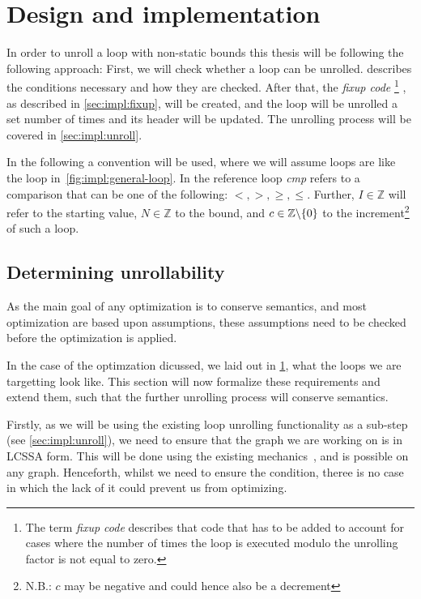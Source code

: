 \chapter{Design and implementation}\label{sec:impl}

In order to unroll a loop with non-static bounds this thesis will be following the following approach:
First, we will check whether a loop can be unrolled.
 describes the conditions necessary and how they are checked.
After that, the \textit{fixup code}
\footnote{The term \textit{fixup code} describes that code that has to be added to account for cases where the number of times the loop is executed modulo the unrolling factor is not equal to zero.}
, as described in \cref{sec:impl:fixup}, will be created, and the loop will be unrolled a set number of times and its header will be updated.
The unrolling process will be covered in \cref{sec:impl:unroll}.

In the following a convention will be used, where we will assume loops are like the loop in~\cref{fig:impl:general-loop}.
In the reference loop \textit{cmp} refers to a comparison that can be one of the following: $<, >, \geq, \leq$.
Further, $I \in \mathbb{Z}$ will refer to the starting value, $N \in \mathbb{Z}$ to the bound, and $c \in \mathbb{Z} \backslash \{0\}$ \label{sec:impl::def-c} to the increment\footnote{N.B.: $c$ may be negative and could hence also be a decrement} of such a loop.



\section{Determining unrollability}\label{sec:impl:unrollability}

As the main goal of any optimization is to conserve semantics, and most optimization are based upon assumptions, these assumptions need to be checked before the optimization is applied.

In the case of the optimzation dicussed, we laid out in \cref{sec:impl}, what the loops we are targetting look like.
This section will now formalize these requirements and extend them, such that the further unrolling process will conserve semantics.

Firstly, as we will be using the existing loop unrolling functionality as a sub-step (see \cref{sec:impl:unroll}), we need to ensure that the graph we are working on is in LCSSA form.
This will be done using the existing mechanics~\cite{aebi18bachelorarbeit}, and is possible on any graph.
Henceforth, whilst we need to ensure the condition, theree is no case in which the lack of it could prevent us from optimizing.

